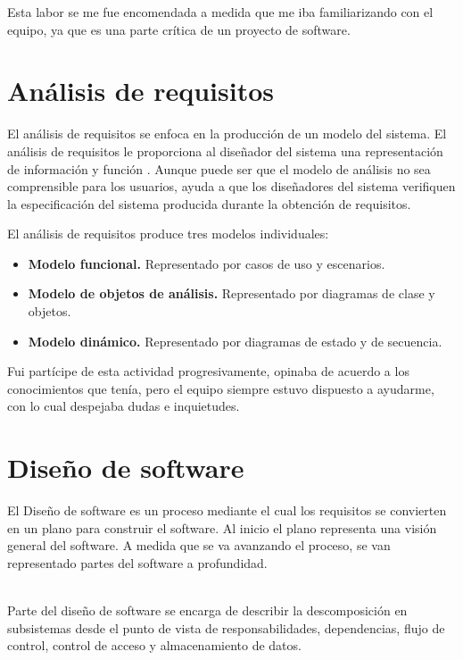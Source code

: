 		Esta labor se me fue encomendada a medida que me iba familiarizando con el
		equipo, ya que es una parte crítica de un proyecto de software.
	
	\section{Análisis de requisitos}
		El análisis de requisitos se enfoca en la producción de un modelo del sistema.
		El análisis de requisitos le proporciona al diseñador del sistema una
		representación de información y función \cite{pressman06ingenieria}. Aunque puede ser que el
		modelo de análisis no sea comprensible para los usuarios, ayuda a que los
		diseñadores del sistema verifiquen la especificación del sistema producida
		durante la obtención de requisitos.
		
		El análisis de requisitos produce tres modelos individuales:
		
		\begin{itemize}
		  \item {\bf Modelo funcional.} {Representado por casos de uso y escenarios.}
		  
		  \item {\bf Modelo de objetos de análisis.} {Representado por diagramas de
		  clase y objetos.}
		  
		  \item {\bf Modelo dinámico.} {Representado por diagramas de estado y de
		  secuencia.}
		\end{itemize}
		
		Fui partícipe de esta actividad progresivamente, opinaba de acuerdo a los
		conocimientos que tenía, pero el equipo siempre estuvo dispuesto a ayudarme,
		con lo cual despejaba dudas e inquietudes.
		
	\section{Diseño de software}
		El Diseño de software es un proceso mediante el cual los requisitos se
		convierten en un plano para construir el software. Al inicio el plano
		representa una visión general del software. A medida que se va avanzando el
		proceso, se van representado partes del software a profundidad.\\\
		
		Parte del diseño de software se encarga de describir la descomposición en
		subsistemas desde el punto de vista de responsabilidades, dependencias, flujo
		de control, control de acceso y almacenamiento de datos.\\\
		
